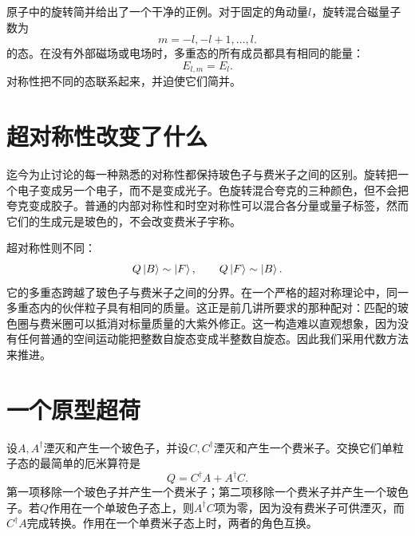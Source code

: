 原子中的旋转简并给出了一个干净的正例。对于固定的角动量\(l\)，旋转混合磁量子数为
\begin{equation}
m=-l,-l+1,\ldots,l.
\end{equation}
的态。在没有外部磁场或电场时，多重态的所有成员都具有相同的能量：
\begin{equation}
E_{l,m}=E_l.
\end{equation}
对称性把不同的态联系起来，并迫使它们简并。

\section{超对称性改变了什么}

迄今为止讨论的每一种熟悉的对称性都保持玻色子与费米子之间的区别。旋转把一个电子变成另一个电子，而不是变成光子。色旋转混合夸克的三种颜色，但不会把夸克变成胶子。普通的内部对称性和时空对称性可以混合各分量或量子标签，然而它们的生成元是玻色的，不会改变费米子宇称。

超对称性则不同：
\begin{equation}
Q\left\lvert B\right\rangle\sim\left\lvert F\right\rangle,
\qquad
Q\left\lvert F\right\rangle\sim\left\lvert B\right\rangle.
\end{equation}
它的多重态跨越了玻色子与费米子之间的分界。在一个严格的超对称理论中，同一多重态内的伙伴粒子具有相同的质量。这正是前几讲所要求的那种配对：匹配的玻色圈与费米圈可以抵消对标量质量的大紫外修正。这一构造难以直观想象，因为没有任何普通的空间运动能把整数自旋态变成半整数自旋态。因此我们采用代数方法来推进。

\section{一个原型超荷}

设\(A,A^\dagger\)湮灭和产生一个玻色子，并设\(C,C^\dagger\)湮灭和产生一个费米子。交换它们单粒子态的最简单的厄米算符是
\begin{equation}
Q=C^\dagger A+A^\dagger C.
\end{equation}
第一项移除一个玻色子并产生一个费米子；第二项移除一个费米子并产生一个玻色子。若\(Q\)作用在一个单玻色子态上，则\(A^\dagger C\)项为零，因为没有费米子可供湮灭，而\(C^\dagger A\)完成转换。作用在一个单费米子态上时，两者的角色互换。

\begin{classroomqa}
\end{classroomqa}

